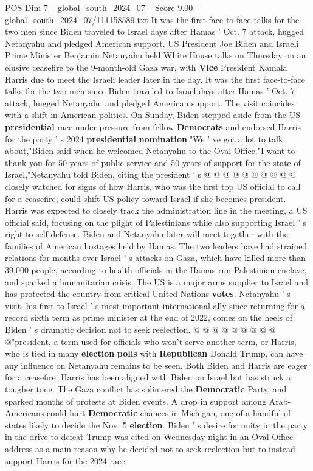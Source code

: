\begin{textsample}{POS Dim 7 – global\_south\_2024\_07 – Score 9.00 – global\_south\_2024\_07/111158589.txt}  \label{ex:f7_pos_110}
It was the first face-to-face talks for the two men since Biden traveled to Israel days after Hamas ' Oct. 7 attack, hugged Netanyahu and pledged American support.
US President Joe Biden and Israeli Prime Minister Benjamin Netanyahu held White House talks on Thursday on an elusive ceasefire to the 9-month-old Gaza war, with \textbf{Vice} President Kamala Harris due to meet the Israeli leader later in the day.
It was the first face-to-face talks for the two men since Biden traveled to Israel days after Hamas ' Oct. 7 attack, hugged Netanyahu and pledged American support.
The visit coincides with a shift in American politics.
On Sunday, Biden stepped aside from the US \textbf{presidential} race under pressure from fellow \textbf{Democrats} and endorsed Harris for the party ' s 2024 \textbf{presidential} \textbf{nomination}."We ' ve got a lot to talk about,"Biden said when he welcomed Netanyahu to the Oval Office."I want to thank you for 50 years of public service and 50 years of support for the state of Israel,"Netanyahu told Biden, citing the president ' s @ @ @ @ @ @ @ @ @ @ closely watched for signs of how Harris, who was the first top US official to call for a ceasefire, could shift US policy toward Israel if she becomes president.
Harris was expected to closely track the administration line in the meeting, a US official said, focusing on the plight of Palestinians while also supporting Israel ' s right to self-defense.
Biden and Netanyahu later will meet together with the families of American hostages held by Hamas.
The two leaders have had strained relations for months over Israel ' s attacks on Gaza, which have killed more than 39,000 people, according to health officials in the Hamas-run Palestinian enclave, and sparked a humanitarian crisis.
The US is a major arms supplier to Israel and has protected the country from critical United Nations \textbf{votes}.
Netanyahu ' s visit, his first to Israel ' s most important international ally since returning for a record sixth term as prime minister at the end of 2022, comes on the heels of Biden ' s dramatic decision not to seek reelection. @ @ @ @ @ @ @ @ @ @"president, a term used for officials who won't serve another term, or Harris, who is tied in many \textbf{election} \textbf{polls} with \textbf{Republican} Donald Trump, can have any influence on Netanyahu remains to be seen.
Both Biden and Harris are eager for a ceasefire.
Harris has been aligned with Biden on Israel but has struck a tougher tone.
The Gaza conflict has splintered the \textbf{Democratic} Party, and sparked months of protests at Biden events.
A drop in support among Arab-Americans could hurt \textbf{Democratic} chances in Michigan, one of a handful of states likely to decide the Nov. 5 \textbf{election}.
Biden ' s desire for unity in the party in the drive to defeat Trump was cited on Wednesday night in an Oval Office address as a main reason why he decided not to seek reelection but to instead support Harris for the 2024 race.

\end{textsample}
